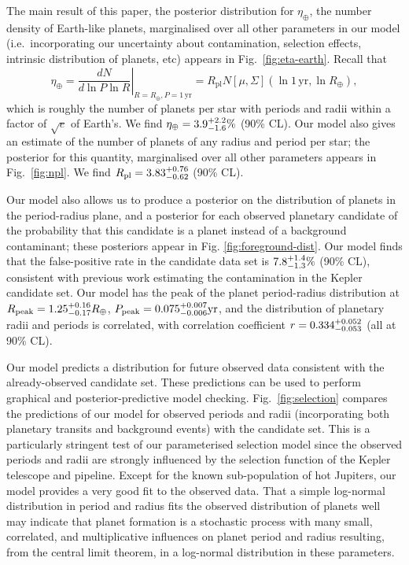 \documentclass{nature}
\newcommand{\etaearth}{\eta_\oplus}
\newcommand{\Rpeak}{R_\mathrm{peak}}
\newcommand{\REarth}{R_\oplus}
\newcommand{\Rpl}{R_\mathrm{pl}}
\begin{document}
The main result of this paper, the posterior distribution for
$\etaearth$, the number density of Earth-like planets, marginalised
over all other parameters in our model (i.e.\ incorporating our
uncertainty about contamination, selection effects, intrinsic
distribution of planets, etc) appears in Fig.\ \ref{fig:eta-earth}.
Recall that
\begin{equation}
  \etaearth = \left. \frac{dN}{d \ln P \ln R} \right|_{R = \REarth, P
    = 1\,\mathrm{yr}} = \Rpl N\left[ \mu, \Sigma \right]\left( \ln 1\,\mathrm{yr},
  \ln \REarth \right),
\end{equation}
which is roughly the number of planets per star with periods and radii
within a factor of $\sqrt{e}$ of Earth's.  We find $\etaearth =
\earange$ (90\% CL).  Our model also gives an estimate of the number
of planets of any radius and period per star; the posterior for this
quantity, marginalised over all other parameters appears in
Fig.\ \ref{fig:npl}.  We find $\Rpl = \rplrange$ (90\% CL).

Our model also allows us to produce a posterior on the distribution of
planets in the period-radius plane, and a posterior for each observed
planetary candidate of the probability that this candidate is a planet
instead of a background contaminant; these posteriors appear in
Fig. \ref{fig:foreground-dist}.  Our model finds that the
false-positive rate in the candidate data set is $7.8_{-1.3}^{+1.4}\%$ (90\%
CL), consistent with previous work\cite{Fressin2013} estimating the
contamination in the Kepler candidate set.  Our model has the peak of
the planet period-radius distribution at $\Rpeak = \rpeakrange
\REarth$, $P_\mathrm{peak} = 0.075_{-0.006}^{+0.007} \mathrm{yr}$, and the
distribution of planetary radii and periods is correlated, with
correlation coefficient $r = 0.334_{-0.053}^{+0.052}$ (all at 90\% CL).

Our model predicts a distribution for future observed data consistent
with the already-observed candidate set.  These predictions can be
used to perform graphical and posterior-predictive model
checking\cite{Gelman2013}.  Fig.\ \ref{fig:selection} compares the
predictions of our model for observed periods and radii (incorporating
both planetary transits and background events) with the candidate set.
This is a particularly stringent test of our parameterised selection
model since the observed periods and radii are strongly influenced by
the selection function of the Kepler telescope and pipeline.  Except
for the known sub-population of hot
Jupiters\cite{Albrecht2012,Naoz2012}, our model provides a very good
fit to the observed data.  That a simple log-normal distribution in
period and radius fits the observed distribution of planets well may
indicate that planet formation is a stochastic process with many
small, correlated, and multiplicative influences on planet period and
radius resulting, from the central limit theorem, in a log-normal
distribution in these parameters.
\end{document}
